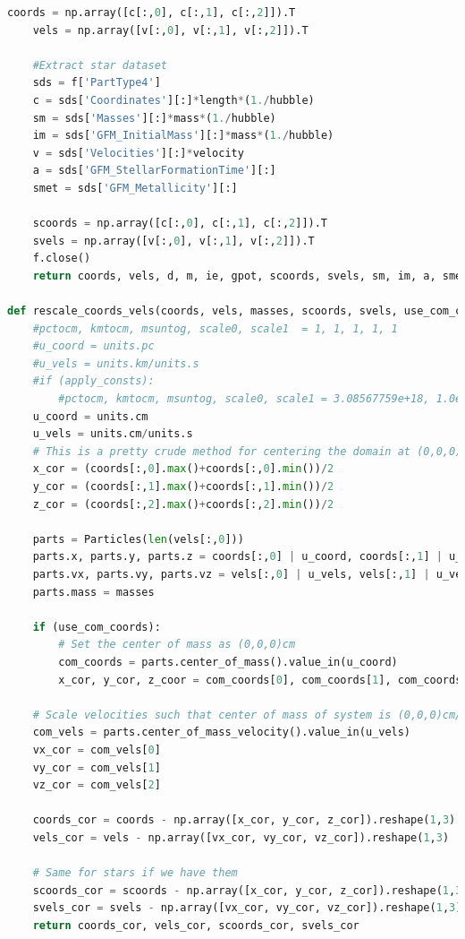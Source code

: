\documentclass[twoside]{drexel-thesis}
\begin{document}
\begin{lstlisting}[language=python]
    coords = np.array([c[:,0], c[:,1], c[:,2]]).T
    vels = np.array([v[:,0], v[:,1], v[:,2]]).T

    #Extract star dataset
    sds = f['PartType4']
    c = sds['Coordinates'][:]*length*(1./hubble)
    sm = sds['Masses'][:]*mass*(1./hubble)
    im = sds['GFM_InitialMass'][:]*mass*(1./hubble)
    v = sds['Velocities'][:]*velocity
    a = sds['GFM_StellarFormationTime'][:]
    smet = sds['GFM_Metallicity'][:]

    scoords = np.array([c[:,0], c[:,1], c[:,2]]).T
    svels = np.array([v[:,0], v[:,1], v[:,2]]).T
    f.close()
    return coords, vels, d, m, ie, gpot, scoords, svels, sm, im, a, smet

def rescale_coords_vels(coords, vels, masses, scoords, svels, use_com_coords=False):
    #pctocm, kmtocm, msuntog, scale0, scale1  = 1, 1, 1, 1, 1
    #u_coord = units.pc
    #u_vels = units.km/units.s
    #if (apply_consts):
        #pctocm, kmtocm, msuntog, scale0, scale1 = 3.08567759e+18, 1.0e5, 1.989e33, 0.7e3, 0.7e10
    u_coord = units.cm
    u_vels = units.cm/units.s
    # This is a pretty crude method for centering the domain at (0,0,0)cm but it works for now.
    x_cor = (coords[:,0].max()+coords[:,0].min())/2
    y_cor = (coords[:,1].max()+coords[:,1].min())/2
    z_cor = (coords[:,2].max()+coords[:,2].min())/2
    
    parts = Particles(len(vels[:,0]))
    parts.x, parts.y, parts.z = coords[:,0] | u_coord, coords[:,1] | u_coord, coords[:,2] | u_coord
    parts.vx, parts.vy, parts.vz = vels[:,0] | u_vels, vels[:,1] | u_vels, vels[:,2] | u_vels
    parts.mass = masses
    
    if (use_com_coords):
        # Set the center of mass as (0,0,0)cm
        com_coords = parts.center_of_mass().value_in(u_coord)
        x_cor, y_cor, z_coor = com_coords[0], com_coords[1], com_coords[2]

    # Scale velocities such that center of mass of system is (0,0,0)cm/s
    com_vels = parts.center_of_mass_velocity().value_in(u_vels)
    vx_cor = com_vels[0]
    vy_cor = com_vels[1]
    vz_cor = com_vels[2]

    coords_cor = coords - np.array([x_cor, y_cor, z_cor]).reshape(1,3)
    vels_cor = vels - np.array([vx_cor, vy_cor, vz_cor]).reshape(1,3)

    # Same for stars if we have them
    scoords_cor = scoords - np.array([x_cor, y_cor, z_cor]).reshape(1,3)
    svels_cor = svels - np.array([vx_cor, vy_cor, vz_cor]).reshape(1,3)
    return coords_cor, vels_cor, scoords_cor, svels_cor


\end{lstlisting}
\end{document}
